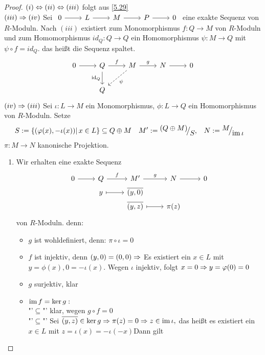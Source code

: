 \begin{proof}
	$(i) \Leftrightarrow (ii) \Leftrightarrow (iii) $ folgt aus \ref{5.29} \\
	$(iii) \Rightarrow (iv) $ Sei $\begin{tikzcd}
	0  \arrow{r} & L \arrow{r} & M \arrow{r} & P \arrow{r} & 0
	\end{tikzcd} $ eine exakte Sequenz von $R$-Moduln.
	Nach $(iii)$ existiert zum Monomorphismus $f: Q \to M $ von $R$-Moduln und zum Homomorphismus $ id_Q : Q \to Q $ ein Homomorphismus $\psi: M \to Q$ mit $ \psi \circ f = id_Q $. das heißt die Sequenz spaltet.
	$$\begin{tikzcd}
	0\arrow{r} & Q \arrow[swap]{d}{\id_Q} \arrow{r}{f} & M \arrow[dashed]{dl}{\psi} \arrow{r}{g} & N \arrow{r} & 0\\& Q & & &
	\end{tikzcd}
	$$ 
	$(iv) \Rightarrow (iii) $ Sei $\iota : L \to M $ ein Monomorphismus, $ \phi: L \to Q $ ein Homomorphismus von $R$-Moduln. Setze 
 \begin{align*} S &:= \{ (\phi(x), - \iota(x))| \, x \in L\} \subseteq Q \oplus M & M' &:= \QR{(Q \oplus M)}{S},& N &:= \QR{M}{\im \iota}\end{align*} $\pi: M \to N$  kanonische Projektion. 
	\begin{enumerate}
		\item  Wir erhalten eine exakte Sequenz
		 $$\begin{tikzcd}[row sep = 0.1ex]	0  \arrow{r} & Q \arrow{r}{f} & M' \arrow{r}{g} & N \arrow{r} & 0 \\
		 & y \arrow[mapsto]{r} & \bar{(y,0)} & & \\
		 & & \bar{(y,z)} \arrow[mapsto]{r} & \pi(z) & 
		\end{tikzcd} $$
		 von $R$-Moduln. denn: 
			\begin{itemize}
			\item $g$ ist wohldefiniert, denn: $\pi \circ \iota = 0$
			\item $f$ ist injektiv, denn $ (y,0) = (0,0)  \Rightarrow $ Es existiert ein $ x \in L $ mit $ y= \phi(x), 0 = - \iota(x)$. Wegen $\iota$ injektiv, folgt $ x = 0 \Rightarrow y = \varphi(0) = 0 $
			\item $g$ surjektiv, klar
			\item $\operatorname{im} f = \ker g: $\\ "'$\subseteq$"' klar, wegen $g \circ f = 0 $\\ 
			"'$\subseteq$"' Sei $\overline{(y,z)} \in \ker g \Rightarrow \pi(z) = 0 \Rightarrow z \in \operatorname{im} \iota,$ das heißt es existiert ein $ x \in L $  mit $ z = \iota(x) = -\iota(-x)$Dann gilt

\end{itemize}
\end{enumerate}
\end{proof}
